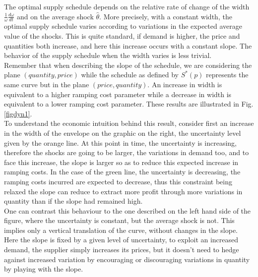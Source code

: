 The optimal supply schedule depends on the relative rate of change of the width $\frac{1}{\omega}\frac{d\omega}{dt}$ and on the average shock $\hat{\theta}$. More precisely, with a constant width, the optimal supply schedule varies according to variations in the expected average value of the shocks. This is quite standard, if demand is higher, the price and quantities both increase, and here this increase occurs with a constant slope. The behavior of the supply schedule when the width varies is less trivial. \\

Remember that when describing the slope of the schedule, we are considering the plane $(quantity, price)$ while the schedule as defined by $S^*(p)$ represents the same curve but in the plane $(price, quantity)$. An increase in width is equivalent to a higher ramping cost parameter while a decrease in width is equivalent to a lower ramping cost parameter. These results are illustrated in Fig. \ref{figdyn1}. \\

To understand the economic intuition behind this result, consider first an increase in the width of the envelope on the graphic on the right, the uncertainty level given by the orange line. At this point in time, the uncertainty is increasing, therefore the shocks are going to be larger, the variations in demand too, and to face this increase, the slope is larger so as to reduce this expected increase in ramping costs. In the case of the green line, the uncertainty is decreasing, the ramping costs incurred are expected to decrease, thus this constraint being relaxed the slope can reduce to extract more profit through more variations in quantity than if the slope had remained high.\\

One can contrast this behaviour to the one described on the left hand side of the figure, where the uncertainty is constant, but the average shock is not. This implies only a vertical translation of the curve, without changes in the slope. Here the slope is fixed by a given level of uncertainty, to exploit an increased demand, the supplier simply increases its prices, but it doesn't need to hedge against increased variation by encouraging or discouraging variations in quantity by playing with the slope.\\


